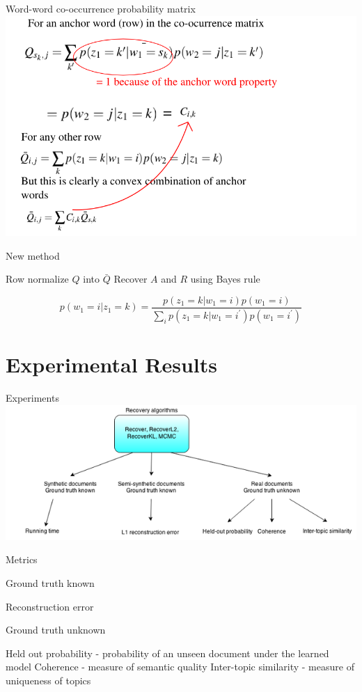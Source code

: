 \documentclass{lecture}
\begin{document}
\begin{plain}{Word-word co-occurrence probability matrix}
\includegraphics[scale=0.5]{figs/Q}
\end{plain}

\begin{plain}{New method}
\begin{itemize}
\p Row normalize $Q$ into $\bar{Q}$
\p Recover $A$ and $R$ using Bayes rule
\end{itemize}
$$p(w_1 = i | z_1 = k) = \frac{p(z_1 = k | w_1 = i)p(w_1 = i)}{\sum_i{p(z_1=k | w_1 = i^\prime)p(w_1=i^\prime)}}$$
\end{plain}

\section[Results]{Experimental Results}
\begin{plain}{Experiments}
\includegraphics[scale=0.5]{figs/results_method}
\end{plain}

\begin{plain}{Metrics}
\begin{itemize}
\p Ground truth known
\begin{itemize}
\p Reconstruction error
\end{itemize}
\p Ground truth unknown
\begin{itemize}
\p Held out probability - probability of an unseen document under the learned model
\p Coherence - measure of semantic quality
\p Inter-topic similarity - measure of uniqueness of topics
\end{itemize}
\end{itemize}


\end{plain}
\end{document}
